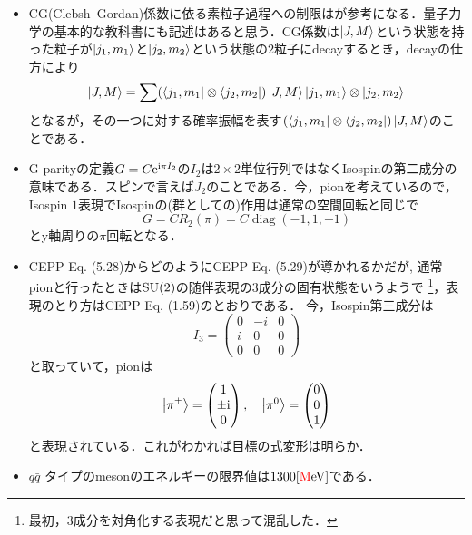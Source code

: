 \begin{itemize}
		\item CG(Clebsh--Gordan)係数に依る素粒子過程への制限は\cite[Chap.4]{BB03663366}が参考になる．量子力学の基本的な教科書にも記述はあると思う．CG係数は$\ket{J, M} $という状態を持った粒子が$\ket{j_1, m_1} $と$\ket{j_2, m_2} $という状態の$2 $粒子にdecayするとき，decayの仕方により
				\begin{equation}
						\ket{J, M} = \sum (\bra{j_1, m_1}\otimes\bra{j_2, m_2})\ket{J, M} \ket{j_1, m_1}\otimes\ket{j_2, m_2}
				\end{equation}
				となるが，その一つに対する確率振幅を表す$ (\bra{j_1, m_1}\otimes\bra{j_2, m_2})\ket{J, M}$のことである．
		\item G-parityの定義$G = C\mathrm{e}^{\mathrm{i}\pi I_2} $の$I_2 $は$2\times 2 $単位行列ではなくIsospinの第二成分の意味である．スピンで言えば$J_2 $のことである．今，pionを考えているので，Isospin $1 $表現でIsospinの(群としての)作用は通常の空間回転と同じで
				\begin{equation}
						G = CR_2(\pi)  = C\operatorname{diag}(-1, 1, -1)
				\end{equation}
				とy軸周りの$\pi $回転となる．
		\item CEPP Eq. (5.28)からどのようにCEPP Eq. (5.29)が導かれるかだが,
				通常pionと行ったときは$\mathrm{SU}(2) $の随伴表現の$3 $成分の固有状態をいうようで
				\footnote{最初，$3 $成分を対角化する表現だと思って混乱した．}\cite{Bransden2015}，表現のとり方はCEPP Eq. (1.59)のとおりである．
				今，Isospin第三成分は
				\begin{equation}
						I_3 = \begin{pmatrix}
								0 & -i & 0\\
								i & 0 & 0\\
								0 & 0 & 0
						\end{pmatrix}
				\end{equation}
				と取っていて，pionは
				\begin{equation}
						\ket{\pi^{\pm}} = 
						\begin{pmatrix}
								1\\\pm \mathrm{i}\\0
						\end{pmatrix},\quad
						\ket{\pi^{0}} = 
						\begin{pmatrix}
								0\\0\\1
						\end{pmatrix}
				\end{equation}
				と表現されている．これがわかれば目標の式変形は明らか．
		\item $q\bar{q} $ タイプのmesonのエネルギーの限界値は$1300\mathrm{[\textcolor{red}{M}eV]} $である．
\end{itemize}
